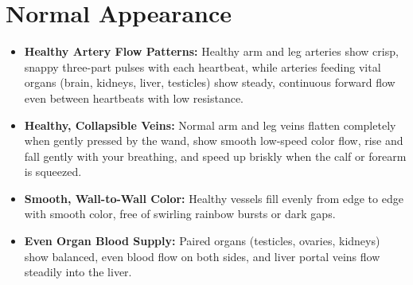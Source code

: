 \section{Normal Appearance}
\begin{itemize}
\item \textbf{Healthy Artery Flow Patterns:} Healthy arm and leg arteries show crisp, snappy three-part pulses with each heartbeat, while arteries feeding vital organs (brain, kidneys, liver, testicles) show steady, continuous forward flow even between heartbeats with low resistance.
\item \textbf{Healthy, Collapsible Veins:} Normal arm and leg veins flatten completely when gently pressed by the wand, show smooth low-speed color flow, rise and fall gently with your breathing, and speed up briskly when the calf or forearm is squeezed.
\item \textbf{Smooth, Wall-to-Wall Color:} Healthy vessels fill evenly from edge to edge with smooth color, free of swirling rainbow bursts or dark gaps.
\item \textbf{Even Organ Blood Supply:} Paired organs (testicles, ovaries, kidneys) show balanced, even blood flow on both sides, and liver portal veins flow steadily into the liver.
\end{itemize}


